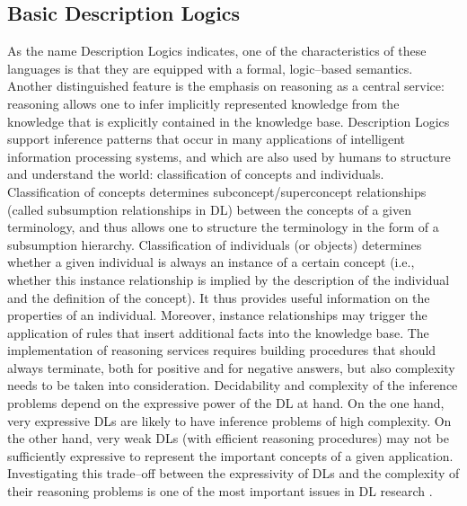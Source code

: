 \documentclass[a4paper, 11pt, oneside]{elsarticle}
\begin{document}
\subsection{Basic Description Logics}
As the name Description Logics indicates, one of the characteristics of these languages is that they are equipped with a formal, logic--based semantics.
Another distinguished feature is the emphasis on reasoning as a central service: reasoning allows one to infer implicitly represented knowledge from the knowledge that is explicitly contained in the knowledge base.
Description Logics support inference patterns that occur in many applications of intelligent information processing systems, and which are also used by humans to structure and understand the world: classification of concepts and individuals.
Classification of concepts determines subconcept/superconcept relationships (called subsumption relationships in DL) between the concepts of a given terminology, and thus allows one to structure the terminology in the form of a subsumption hierarchy.
Classification of individuals (or objects) determines whether a given individual is always an instance of a certain concept (i.e., whether this instance relationship is implied by the description of the individual and the definition of the concept).
It thus provides useful information on the properties of an individual.
Moreover, instance relationships may trigger the application of rules that insert additional facts into the knowledge base.
The implementation of reasoning services requires building procedures that should always terminate, both for positive and for negative answers, but also complexity needs to be taken into consideration.
Decidability and complexity of the inference problems depend on the expressive power of the DL at hand.
On the one hand, very expressive DLs are likely to have inference problems of high complexity.
On the other hand, very weak DLs (with efficient reasoning procedures) may not be sufficiently expressive to represent the important concepts of a given application.
Investigating this trade--off between the expressivity of DLs and the complexity of their reasoning problems is one of the most important issues in DL research
\cite{Baader:2003:BDL:885746.885749}.


\newpage
\end{document}
